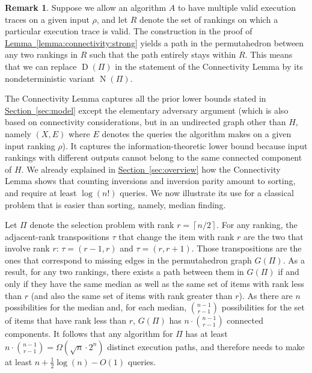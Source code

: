 \documentclass[11pt]{article}
\numberwithin{equation}{section}
\theoremstyle{definition}
\newtheorem{remark}[theorem]{Remark}
\theoremstyle{plain}
\newcommand{\expref}[2]{\hyperref[#2]{#1~\ref{#2}}}
\newcommand{\ceil}[1]{\left\lceil #1\right\rceil}
\newcommand{\ranking}{\rho}
\newcommand{\transposition}{\tau}
\DeclareMathOperator{\traces}{D}
\DeclareMathOperator{\NQ}{N}
\begin{document}
\begin{remark}\label{remark:connectivity}
Suppose we allow an algorithm $A$ to have multiple valid execution traces on a given input $\ranking$, and let $R$ denote the set of rankings on which a particular execution trace is valid. The construction in the proof of \expref{Lemma}{lemma:connectivity:strong} yields a path in the permutahedron between any two rankings in $R$ such that the path entirely stays within $R$. This means that we can replace $\traces(\Pi)$ in the statement of the Connectivity Lemma by its nondeterministic variant $\NQ(\Pi)$.
\end{remark}

The Connectivity Lemma captures all the prior lower bounds stated in \expref{Section}{sec:model} except the elementary adversary argument (which is also based on connectivity considerations, but in an undirected graph other than $H$, namely $(X,E)$ where $E$ denotes the queries the algorithm makes on a given input ranking $\ranking$). It captures the
%
information-theoretic lower bound because input rankings with different outputs cannot belong to the same connected component of $H$. We already explained in \expref{Section}{sec:overview} how the Connectivity Lemma shows that counting inversions and inversion parity amount to sorting, and require at least $\log(n!)$ queries. We now illustrate its use for a classical problem that is easier than sorting, 
%
namely, median finding.  %

Let $\Pi$ denote the selection problem with rank $r = \ceil{n/2}$. For any ranking, the adjacent-rank transpositions $\transposition$ that change the item with rank $r$ are the two that involve rank $r$: $\transposition = (r-1,r)$ and $\transposition = (r,r+1)$. Those transpositions are the ones that correspond to missing edges in the permutahedron graph $G(\Pi)$. As a result, for any two rankings, there exists a path between them in $G(\Pi)$ if and only if they have the same median as well as the same set of items with rank less than $r$ (and also the same set of items with rank greater than $r$). As there are $n$ possibilities for the median and, for each median, $\binom{n-1}{r-1}$ possibilities for the set of items that have rank less than $r$, $G(\Pi)$ has $n \cdot \binom{n-1}{r-1}$ connected components. It follows that any algorithm for $\Pi$ has at least $n \cdot \binom{n-1}{r-1} = \Omega(\sqrt{n}\cdot 2^n)$ distinct execution paths, and therefore needs to make at least $n + \frac{1}{2} \log(n) - O(1)$ queries. 
\end{document}

